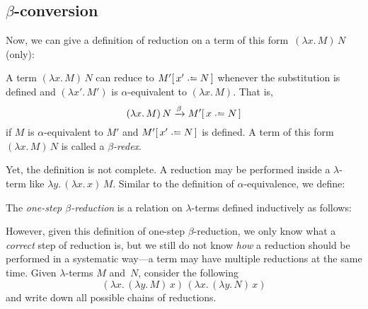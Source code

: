 \subsection{$\beta$-conversion}
Now, we can give a definition of reduction on a term of this form~$(\lambda
x.\, M)\, N$ (only):
\begin{definition}
  A term $(\lambda x.\, M)\, N$ can reduce to $M'\subst{x'}{N}$ whenever the
  substitution is defined and $(\lambda x'.\, M')$ is $\alpha$-equivalent to
  $(\lambda x.\, M)$. 
  That is,
  \[
    (\lambda x.\, M)\, N \xrightarrow{\beta} M'\subst{x}{N}
  \]
  if $M$ is $\alpha$-equivalent to $M'$ and
  $M'\subst{x'}{N}$ is defined.  A term of this form $(\lambda x.\, M)\, N$ is
  called a \emph{$\beta$-redex}.
\end{definition}
Yet, the definition is not complete. A reduction may be performed inside a
$\lambda$-term like $\lambda y.\, (\lambda x.\, x)\, M$. Similar to the
definition of $\alpha$-equivalence, we define:
\begin{definition}
  The \emph{one-step $\beta$-reduction} is a relation on $\lambda$-terms
  defined inductively as follows:
  \begin{multicols}{2}
    \begin{prooftree}
    \end{prooftree}
    \begin{prooftree}
    \end{prooftree}
    \begin{prooftree}
    \end{prooftree}
    \begin{prooftree}
    \end{prooftree}
  \end{multicols}
\end{definition}
%
However, given this definition of one-step $\beta$-reduction, we only know what a
\emph{correct} step of reduction is, but we still do not know \emph{how} 
a reduction should be performed in a systematic way---a term may have multiple
reductions at the same time. Given $\lambda$-terms $M$ and~$N$, consider the following
\[
  (\lambda x.\, (\lambda y.\, M)\,x)\,
  (\lambda x.\, (\lambda y.\, N)\,x)
\]
and write down all possible chains of reductions.
